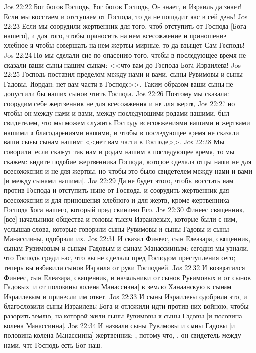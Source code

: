 \vs Jos 22:22 Бог богов Господь, Бог богов Господь, Он знает, и Израиль да знает! Если мы восстаем и отступаем от Господа, то да не пощадит нас  в сей день!
\vs Jos 22:23 Если мы соорудили жертвенник для того, чтоб отступить от Господа [Бога нашего], и для того, чтобы приносить на нем всесожжение и приношение хлебное и чтобы совершать на нем жертвы мирные, то да взыщет Сам Господь!
\vs Jos 22:24 Но мы сделали сие по опасению того, чтобы в последующее время не сказали ваши сыны нашим сынам: <<что вам до Господа Бога Израилева!
\vs Jos 22:25 Господь поставил пределом между нами и вами, сыны Рувимовы и сыны Гадовы, Иордан: нет вам части в Господе>>. Таким образом ваши сыны не допустили бы наших сынов чтить Господа.
\vs Jos 22:26 Поэтому мы сказали: соорудим себе жертвенник не для всесожжения и не для жертв,
\vs Jos 22:27 но чтобы он между нами и вами, между последующими родами нашими, был свидетелем, что мы можем служить Господу всесожжениями нашими и жертвами нашими и благодарениями нашими, и чтобы в последующее время не сказали ваши сыны сынам нашим: <<нет вам части в Господе>>.
\vs Jos 22:28 Мы говорили: если скажут так нам и родам нашим в последующее время, то мы скажем: видите подобие жертвенника Господа, которое сделали отцы наши не для всесожжения и не для жертвы, но чтобы это было свидетелем между нами и вами [и между сынами нашими].
\vs Jos 22:29 Да не будет этого, чтобы восстать нам против Господа и отступить ныне от Господа, и соорудить жертвенник для всесожжения и для приношения хлебного и для жертв, кроме жертвенника Господа Бога нашего, который пред скиниею Его.
\vs Jos 22:30 Финеес священник, [все] начальники общества и головы тысяч Израилевых, которые были с ним, услышав слова, которые говорили сыны Рувимовы и сыны Гадовы и сыны Манассиины, одобрили их.
\vs Jos 22:31 И сказал Финеес, сын Елеазара, священник, сынам Рувимовым и сынам Гадовым и сынам Манассииным: сегодня мы узнали, что Господь среди нас, что вы не сделали пред Господом преступления сего; теперь вы избавили сынов Израиля от руки Господней.
\vs Jos 22:32 И возвратился Финеес, сын Елеазара, священник, и начальники от сынов Рувимовых и от сынов Гадовых [и от половины колена Манассиина] в землю Ханаанскую к сынам Израилевым и принесли им ответ.
\vs Jos 22:33 И сыны Израилевы одобрили это, и благословили сыны Израилевы Бога и отложили идти против них войною, чтобы разорить землю, на которой жили сыны Рувимовы и сыны Гадовы [и половина колена Манассиина].
\vs Jos 22:34 И назвали сыны Рувимовы и сыны Гадовы [и половина колена Манассиина] жертвенник: , потому что, , он свидетель между нами, что Господь есть Бог наш.
